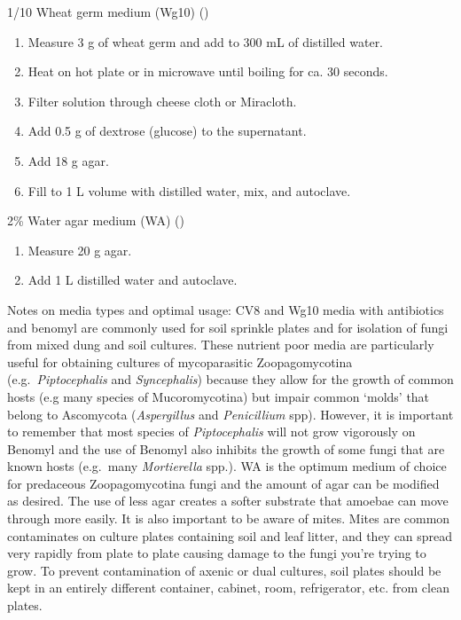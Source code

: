\documentclass[]{book}
\providecommand{\tightlist}{%
  \setlength{\itemsep}{0pt}\setlength{\parskip}{0pt}}
\begin{document}
{1/10 Wheat germ medium} (Wg10) (\citet{Benny_2016})

\begin{enumerate}
\def\labelenumi{\arabic{enumi}.}
\tightlist
\item
  Measure 3 g of wheat germ and add to 300 mL of distilled water.
\item
  Heat on hot plate or in microwave until boiling for ca. 30 seconds.
\item
  Filter solution through cheese cloth or Miracloth.
\item
  Add 0.5 g of dextrose (glucose) to the supernatant.
\item
  Add 18 g agar.
\item
  Fill to 1 L volume with distilled water, mix, and autoclave.
\end{enumerate}

{2\% Water agar medium} (WA) (\citet{Lichtwardt_1986})

\begin{enumerate}
\def\labelenumi{\arabic{enumi}.}
\tightlist
\item
  Measure 20 g agar.
\item
  Add 1 L distilled water and autoclave.
\end{enumerate}

Notes on media types and optimal usage: CV8 and Wg10 media with antibiotics and benomyl are commonly used for soil sprinkle plates and for isolation of fungi from mixed dung and soil cultures. These nutrient poor media are particularly useful for obtaining cultures of mycoparasitic Zoopagomycotina (e.g.~\emph{Piptocephalis} and \emph{Syncephalis}) because they allow for the growth of common hosts (e.g many species of Mucoromycotina) but impair common `molds' that belong to Ascomycota (\emph{Aspergillus} and \emph{Penicillium} spp). However, it is important to remember that most species of \emph{Piptocephalis} will not grow vigorously on Benomyl and the use of Benomyl also inhibits the growth of some fungi that are known hosts (e.g.~many \emph{Mortierella} spp.). WA is the optimum medium of choice for predaceous Zoopagomycotina fungi and the amount of agar can be modified as desired. The use of less agar creates a softer substrate that amoebae can move through more easily. It is also important to be aware of mites. Mites are common contaminates on culture plates containing soil and leaf litter, and they can spread very rapidly from plate to plate causing damage to the fungi you're trying to grow. To prevent contamination of axenic or dual cultures, soil plates should be kept in an entirely different container, cabinet, room, refrigerator, etc. from clean plates.
\end{document}
